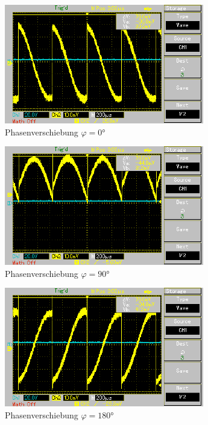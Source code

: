 \begin{figure}
    \begin{subfigure}{0.48\textwidth}
        \centering
        \includegraphics{Oszilloskop_0.pdf}
        \caption{Phasenverschiebung $\varphi = 0°$}
        \label{fig:0deg}
    \end{subfigure}
    \hfill
    \begin{subfigure}{0.48\textwidth}
        \centering
        \includegraphics{Oszilloskop_90.pdf}
        \caption{Phasenverschiebung $\varphi = 90°$}
        \label{fig:90deg}
    \end{subfigure}
    \hfill
    \begin{subfigure}{0.48\textwidth}
        \centering
        \includegraphics{Oszilloskop_180.pdf}
        \caption{Phasenverschiebung $\varphi = 180°$}
        \label{fig:180deg}
    \end{subfigure}
    \hfill
    \begin{subfigure}{0.48\textwidth}
        \centering

\end{subfigure}
\end{figure}
